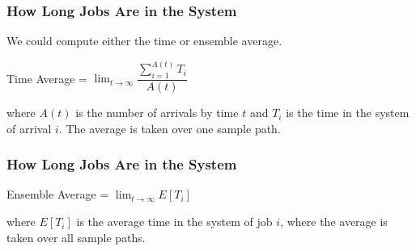 \begin{frame}
\frametitle{How Long Jobs Are in the System}

We could compute either the time or ensemble average. 

\begin{center}
	Time Average = $\lim_{t\to\infty}\dfrac{\sum_{i=1}^{A(t)} T_{i}}{A(t)}$
\end{center}

where $A(t)$ is the number of arrivals by time $t$ and $T_{i}$ is the time in the system of arrival $i$. The average is taken over one sample path.


\end{frame}

\begin{frame}
\frametitle{How Long Jobs Are in the System}

\begin{center}
	Ensemble Average = $\lim_{t\to\infty}E[T_{i}]$
\end{center}

where $E[T_{i}]$ is the average time in the system of job $i$, where the average is taken over all sample paths.


\end{frame}



